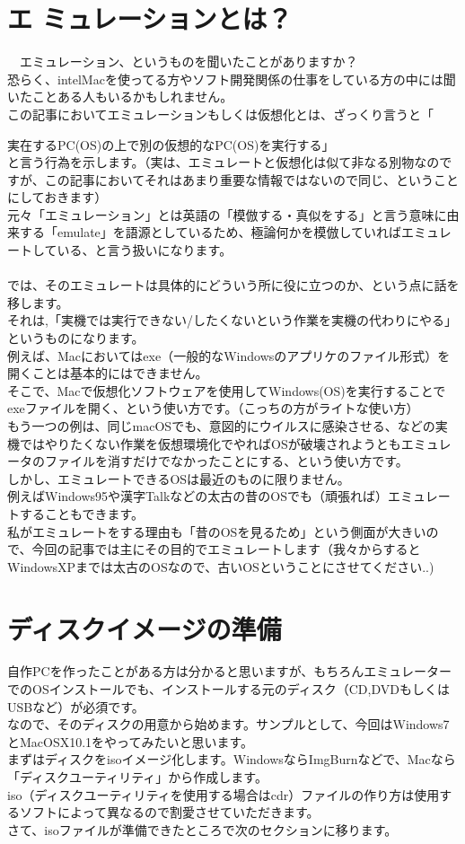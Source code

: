 \documentclass[b5paper,9pt,platex,dvipdfmx]{jsarticle}
\begin{document}
\begin{multicols*}{3}
\section{エ
ミュレーションとは？}
　エミュレーション、というものを聞いたことがありますか？\\
恐らく、intelMacを使ってる方やソフト開発関係の仕事をしている方の中には聞いたことある人もいるかもしれません。\\
この記事においてエミュレーションもしくは仮想化とは、ざっくり言うと「{実在するPC(OS)の上で別の仮想的なPC(OS)を実行する」\\
と言う行為を示します。（実は、エミュレートと仮想化は似て非なる別物なのですが、この記事においてそれはあまり重要な情報ではないので同じ、ということにしておきます）\\
元々「エミュレーション」とは英語の「模倣する・真似をする」と言う意味に由来する「emulate」を語源としているため、極論何かを模倣していればエミュレートしている、と言う扱いになります。\\
\\
では、そのエミュレートは具体的にどういう所に役に立つのか、という点に話を移します。\\
それは,「実機では実行できない/したくないという作業を実機の代わりにやる」というものになります。\\
例えば、Macにおいてはexe（一般的なWindowsのアプリケのファイル形式）を開くことは基本的にはできません。\\
そこで、Macで仮想化ソフトウェアを使用してWindows(OS)を実行することでexeファイルを開く、という使い方です。（こっちの方がライトな使い方）\\
もう一つの例は、同じmacOSでも、意図的にウイルスに感染させる、などの実機ではやりたくない作業を仮想環境化でやればOSが破壊されようともエミュレータのファイルを消すだけでなかったことにする、という使い方です。\\
しかし、エミュレートできるOSは最近のものに限りません。\\
例えばWindows95や漢字Talkなどの太古の昔のOSでも（頑張れば）エミュレートすることもできます。\\
私がエミュレートをする理由も「昔のOSを見るため」という側面が大きいので、今回の記事では主にその目的でエミュレートします（我々からするとWindowsXPまでは太古のOSなので、古いOSということにさせてください..)\\
\section{ディスクイメージの準備}
自作PCを作ったことがある方は分かると思いますが、もちろんエミュレーターでのOSインストールでも、インストールする元のディスク（CD,DVDもしくはUSBなど）が必須です。\\
なので、そのディスクの用意から始めます。サンプルとして、今回はWindows7とMacOSX10.1をやってみたいと思います。\\
まずはディスクをisoイメージ化します。WindowsならImgBurnなどで、Macなら「ディスクユーティリティ」から作成します。\\
iso（ディスクユーティリティを使用する場合はcdr）ファイルの作り方は使用するソフトによって異なるので割愛させていただきます。\\
さて、isoファイルが準備できたところで次のセクションに移ります。\\
}
\end{multicols*}
\end{document}
